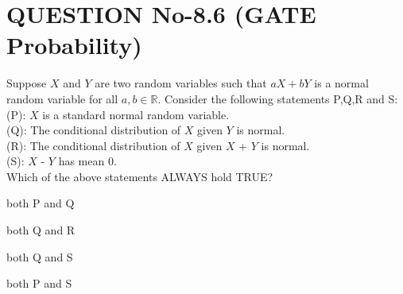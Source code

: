 \documentclass[journal,12pt,twocolumn]{IEEEtran}
\begin{document}
%
\section{QUESTION No-8.6 (GATE Probability)}
Suppose $X$ and $Y$ are two random variables such that $aX + bY$ is a normal random variable for all $a,b \in \mathbb{R}$. Consider the following statements P,Q,R and S: \\
(P): $X$ is a standard normal random variable.\\
(Q): The conditional distribution of $X$ given $Y$ is normal.\\
(R): The conditional distribution of $X$ given $X$ + $Y$ is normal.\\
(S): $X$ - $Y$ has mean $0$.\\
 Which of the above statements ALWAYS hold TRUE?
\begin{enumerate}
\begin{multicols}{2}
\setlength\itemsep{2em}

\item both P and Q
\item both Q and R
\item both Q and S
\item both P and S

\end{multicols}
\end{enumerate}
\end{document}
